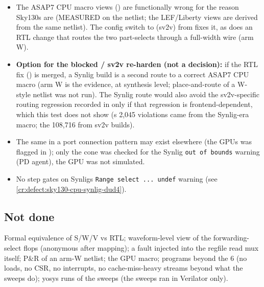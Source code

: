 \begin{record}

\begin{itemize}
\tightlist
\item
  The ASAP7 CPU macro views ()
  are functionally wrong for the reason Sky130\textquotesingle s are
  (MEASURED on the netlist; the LEF/\allowbreak{}Liberty views are
  derived from the same netlist). The config switch to
   (sv2v) from  fixes it, as does an
  RTL change that routes the two part-selects through a full-width wire
  (arm W).
\item
  \textbf{Option for the blocked / sv2v re-harden
  (not a decision):} if the RTL fix () is merged, a Synlig build
  is a second route to a correct ASAP7 CPU macro (arm W is the evidence,
  at synthesis level; place-and-route of a W-style netlist was not run).
  The Synlig route would also avoid the sv2v-specific routing regression
  recorded in  only if that regression is frontend-dependent,
  which this test does not show (\textquotesingle s 2,045
  violations came from the Synlig-era macro; the 108,716 from sv2v
  builds).
\item
  The same  in a port connection pattern may
  exist elsewhere (the GPU\textquotesingle s
   was flagged in ); only the
   cone was checked for the Synlig
  \texttt{out\ of\ bounds} warning (PD agent), the GPU was not
  simulated.
\item
  No step gates on Synlig\textquotesingle s
  \texttt{Range\ select\ .\allowbreak{}.\allowbreak{}.\allowbreak{}\ undef}
  warning (see \cref{cr:defect:sky130-cpu-synlig-dud4}).
\end{itemize}

\end{record}

\subsection{Not done}\label{cr:defect:asap7-cpu-synlig-ma7:not-done}

\begin{record}

Formal equivalence of S/W/V vs RTL; waveform-level view of the
forwarding-select flops (anonymous after mapping); a fault injected into
the regfile read mux itself; P\&R of an arm-W netlist; the GPU macro;
programs beyond the 6 (no loads, no CSR, no interrupts, no
cache-miss-heavy streams beyond what the sweeps do); yosys 
runs of the sweeps (the sweeps ran in Verilator only).

\end{record}

